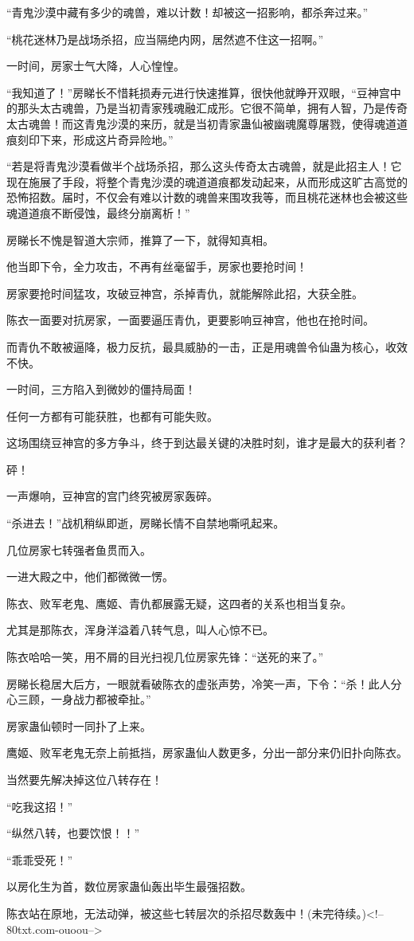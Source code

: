 \begin{this_body}
“青鬼沙漠中藏有多少的魂兽，难以计数！却被这一招影响，都杀奔过来。”

“桃花迷林乃是战场杀招，应当隔绝内网，居然遮不住这一招啊。”

一时间，房家士气大降，人心惶惶。

“我知道了！”房睇长不惜耗损寿元进行快速推算，很快他就睁开双眼，“豆神宫中的那头太古魂兽，乃是当初青家残魂融汇成形。它很不简单，拥有人智，乃是传奇太古魂兽！而这青鬼沙漠的来历，就是当初青家蛊仙被幽魂魔尊屠戮，使得魂道道痕刻印下来，形成这片奇异险地。”

“若是将青鬼沙漠看做半个战场杀招，那么这头传奇太古魂兽，就是此招主人！它现在施展了手段，将整个青鬼沙漠的魂道道痕都发动起来，从而形成这旷古高觉的恐怖招数。届时，不仅会有难以计数的魂兽来围攻我等，而且桃花迷林也会被这些魂道道痕不断侵蚀，最终分崩离析！”

房睇长不愧是智道大宗师，推算了一下，就得知真相。

他当即下令，全力攻击，不再有丝毫留手，房家也要抢时间！

房家要抢时间猛攻，攻破豆神宫，杀掉青仇，就能解除此招，大获全胜。

陈衣一面要对抗房家，一面要逼压青仇，更要影响豆神宫，他也在抢时间。

而青仇不敢被逼降，极力反抗，最具威胁的一击，正是用魂兽令仙蛊为核心，收效不快。

一时间，三方陷入到微妙的僵持局面！

任何一方都有可能获胜，也都有可能失败。

这场围绕豆神宫的多方争斗，终于到达最关键的决胜时刻，谁才是最大的获利者？

砰！

一声爆响，豆神宫的宫门终究被房家轰碎。

“杀进去！”战机稍纵即逝，房睇长情不自禁地嘶吼起来。

几位房家七转强者鱼贯而入。

一进大殿之中，他们都微微一愣。

陈衣、败军老鬼、鹰姬、青仇都展露无疑，这四者的关系也相当复杂。

尤其是那陈衣，浑身洋溢着八转气息，叫人心惊不已。

陈衣哈哈一笑，用不屑的目光扫视几位房家先锋：“送死的来了。”

房睇长稳居大后方，一眼就看破陈衣的虚张声势，冷笑一声，下令：“杀！此人分心三顾，一身战力都被牵扯。”

房家蛊仙顿时一同扑了上来。

鹰姬、败军老鬼无奈上前抵挡，房家蛊仙人数更多，分出一部分来仍旧扑向陈衣。

当然要先解决掉这位八转存在！

“吃我这招！”

“纵然八转，也要饮恨！！”

“乖乖受死！”

以房化生为首，数位房家蛊仙轰出毕生最强招数。

陈衣站在原地，无法动弹，被这些七转层次的杀招尽数轰中！(未完待续。)<!--80txt.com-ouoou-->

\end{this_body}

